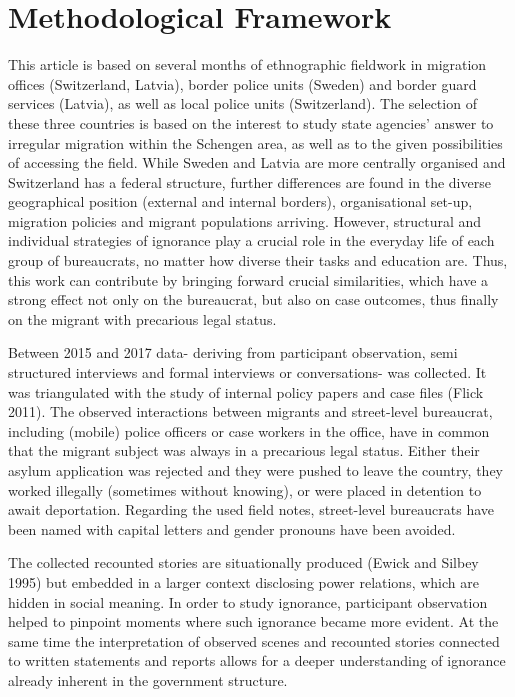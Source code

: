 \chapter{Methodological Framework}
This article is based on several months of ethnographic fieldwork in migration offices  (Switzerland, Latvia), border police units (Sweden) and border guard services (Latvia), as well as local police units (Switzerland). The selection of these three countries is based on the interest to study state agencies’ answer to irregular migration within the Schengen area, as well as to the given possibilities of accessing the field. While Sweden and Latvia are more centrally organised and Switzerland has a federal structure, further differences are found in the diverse geographical position (external and internal borders), organisational set-up, migration policies and migrant populations arriving. However, structural and individual strategies of ignorance play a crucial role in the everyday life of each group of bureaucrats, no matter how diverse their tasks and education are. Thus, this work can contribute by bringing forward crucial similarities, which have a strong effect not only on the bureaucrat, but also on case outcomes, thus finally on the migrant with precarious legal status.
\par
Between 2015 and 2017 data- deriving from participant observation, semi structured interviews and formal interviews or conversations- was collected. It was triangulated with the study of internal policy papers and case files (Flick 2011). The observed interactions between migrants and street-level bureaucrat, including (mobile) police officers or case workers in the office, have in common that the migrant subject was always in a precarious legal status. Either their asylum application was rejected and they were pushed to leave the country, they worked illegally (sometimes without knowing), or were placed in detention to await deportation. Regarding the used field notes, street-level bureaucrats have been named with capital letters and gender pronouns have been avoided.
\par
The collected recounted stories are situationally produced (Ewick and Silbey 1995) but embedded in a larger context disclosing power relations, which are hidden in social meaning. In order to study ignorance, participant observation helped to pinpoint moments where such ignorance became more evident. At the same time the interpretation of observed scenes and recounted stories connected to written statements and reports allows for a deeper understanding of ignorance already inherent in the government structure.

